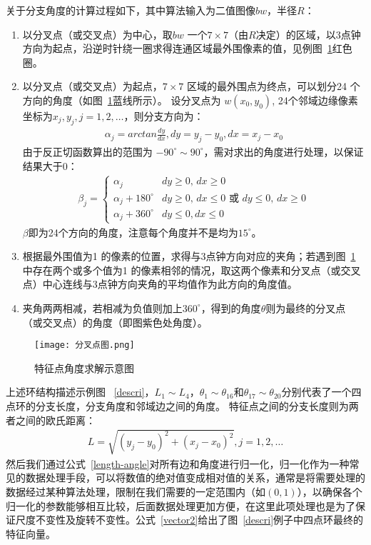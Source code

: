 关于分支角度的计算过程如下，其中算法输入为二值图像$bw$，半径$R$：
\begin{enumerate}
\item 以分叉点（或交叉点）为中心，取$bw$ 一个$7\times7$（由$R$决定）的区域，以3点钟方向为起点，沿逆时针绕一圈求得连通区域最外围像素的值，见例图~\ref{bifur_ex}红色圈。
\item 以分叉点（或交叉点）为起点，$7\times7$ 区域的最外围点为终点，可以划分24 个方向的角度（如图~\ref{bifur_ex}蓝线所示）。
设分叉点为 $w(x_0,y_0)$, 24个邻域边缘像素坐标为$x_j,y_j,j=1,2,\ldots$，则分支方向为：
\begin{align}
\alpha_j = arctan\frac{dy}{dx}, dy = y_j - y_0, dx = x_j - x_0 
\end{align}	 	
由于反正切函数算出的范围为 $-90^{\circ} \sim 90^{\circ}$，需对求出的角度进行处理，以保证结果大于0：
\begin{align}
\beta_j = \left\{ \begin{array}{ll}
\alpha_j & \textrm{$dy \geq 0$, $dx \geq 0$} \\
\alpha_j + 180^{\circ} & \textrm{$dy \geq 0$, $dx \leq 0$ 或 $dy \leq 0$, $dx \geq 0$}\\
\alpha_j + 360^{\circ} & \textrm{$dy \leq 0, dx \leq 0$}
\end{array} \right.
\end{align}	 	
$\beta$即为24个方向的角度，注意每个角度并不是均为$15^{\circ}$。
\item 根据最外围值为1 的像素的位置，求得与3点钟方向对应的夹角；若遇到图~\ref{bifur_ex}中存在两个或多个值为1 的像素相邻的情况，取这两个像素和分叉点（或交叉点）中心连线与3点钟方向夹角的平均值作为此方向的角度值。
\item 夹角两两相减，若相减为负值则加上$360^{\circ}$，得到的角度$\theta$则为最终的分叉点（或交叉点）的角度（即图紫色处角度）。
\end{enumerate}
   \begin{figure}[ht!]
   \centering
  \texttt{[image: 分叉点图.png]}
  \caption{特征点角度求解示意图}
    \label{bifur_ex}
 \end{figure}
上述环结构描述示例图 ~\ref{descri}，$L_1\sim L_4$，$\theta_1\sim\theta_{16}$和$\theta_{17}\sim\theta_{20}$分别代表了一个四点环的分支长度，分支角度和邻域边之间的角度。
特征点之间的分支长度则为两者之间的欧氏距离：
\begin{align}
L = \sqrt{(y_j - y_0)^2 + (x_j - x_0)^2}, j = 1, 2, \ldots
\end{align}	 	
然后我们通过公式~\ref{length-angle}对所有边和角度进行归一化，归一化作为一种常见的数据处理手段，可以将数值的绝对值变成相对值的关系，通常是将需要处理的数据经过某种算法处理，限制在我们需要的一定范围内（如$(0,1)$），以确保各个归一化的参数能够相互比较，后面数据处理更加方便，在这里此项处理也是为了保证尺度不变性及旋转不变性。公式~\ref{vector2}给出了图~\ref{descri}例子中四点环最终的特征向量。
